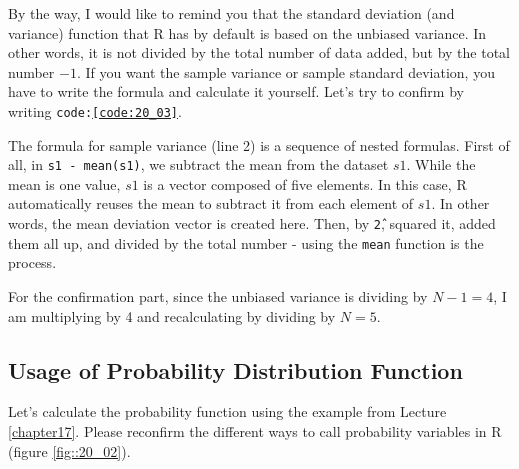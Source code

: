 \documentclass{ltjsbook}
\begin{document}
By the way, I would like to remind you that the standard deviation (and variance) function that R has by default is based on the unbiased variance. In other words, it is not divided by the total number of data added, but by the total number $-1$. If you want the sample variance or sample standard deviation, you have to write the formula and calculate it yourself. Let's try to confirm by writing \texttt{code:\ref{code:20_03}}.


The formula for sample variance (line 2) is a sequence of nested formulas. First of all, in \texttt{s1 - mean(s1)}, we subtract the mean from the dataset $s1$. While the mean is one value, $s1$ is a vector composed of five elements. In this case, R automatically reuses the mean to subtract it from each element of $s1$. In other words, the mean deviation vector is created here. Then, by \texttt{\^ 2}, squared it, added them all up, and divided by the total number - using the \texttt{mean} function is the process.

For the confirmation part, since the unbiased variance is dividing by $N-1=4$, I am multiplying by 4 and recalculating by dividing by $N=5$.

\subsection{Usage of Probability Distribution Function}
Let's calculate the probability function using the example from Lecture \ref{chapter17}. Please reconfirm the different ways to call probability variables in R (figure \ref{fig::20_02}).

\end{document}
